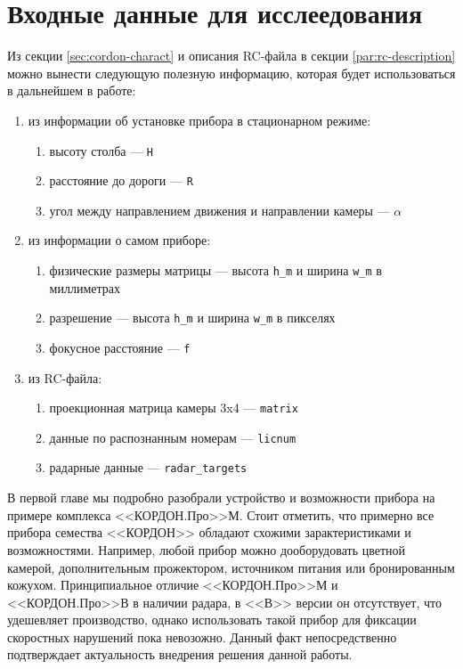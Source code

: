 \documentclass[specification,annotation,times]{itmo-student-thesis}
\begin{document}
\section{Входные данные для исслеедования}
Из секции \ref{sec:cordon-charact} и описания RC-файла в секции \ref{par:rc-description} можно вынести следующую полезную информацию, которая будет использоваться в дальнейшем в работе: 
\begin{enumerate}
	\item из информации об установке прибора в стационарном режиме:
	\begin{enumerate}
		\item высоту столба --- \texttt{H}
		\item расстояние до дороги --- \texttt{R}
		\item угол между направлением движения и направлении камеры --- $ \alpha  $
	\end{enumerate}
	\item из информации о самом приборе:
	\begin{enumerate}
		\item физические размеры матрицы --- высота \texttt{h\_m} и ширина \texttt{w\_m} в миллиметрах
		\item разрешение --- высота \texttt{h\_m} и ширина \texttt{w\_m} в пикселях
		\item фокусное расстояние --- \texttt{f}
	\end{enumerate}
	\item из RC-файла:
	\begin{enumerate}
		\item проекционная матрица камеры 3x4 --- \texttt{matrix}
		\item данные по распознанным номерам --- \texttt{licnum}
		\item радарные данные --- \texttt{radar\_targets}
	\end{enumerate}
\end{enumerate}

\chapterconclusion

В первой главе мы подробно разобрали устройство и возможности прибора на примере комплекса  <<КОРДОН.Про>>М. Стоит отметить, что примерно все прибора семества <<КОРДОН>> обладают схожими зарактеристиками и возможностями. Например, любой прибор можно дооборудовать цветной камерой, дополнительным прожектором, источником питания или бронированным кожухом. Принципиальное отличие <<КОРДОН.Про>>М и <<КОРДОН.Про>>В в наличии радара, в <<В>>  версии он отсутствует, что удешевляет производство, однако использовать такой прибор для фиксации скоростных нарушений пока невозожно. Данный факт непосредственно подтверждает актуальность внедрения решения данной работы.
\end{document}
